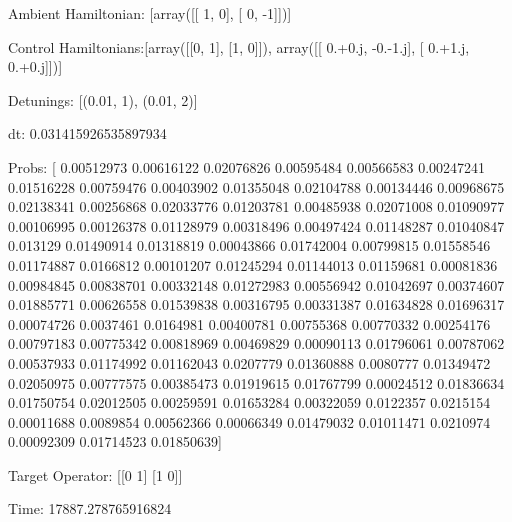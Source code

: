 \documentclass{article}
\begin{document}
    

\newpage

Ambient Hamiltonian: [array([[ 1,  0],
       [ 0, -1]])]

Control Hamiltonians:[array([[0, 1],
       [1, 0]]), array([[ 0.+0.j, -0.-1.j],
       [ 0.+1.j,  0.+0.j]])]

Detunings: [(0.01, 1), (0.01, 2)]

 dt: 0.031415926535897934

Probs: [ 0.00512973  0.00616122  0.02076826  0.00595484  0.00566583  0.00247241
  0.01516228  0.00759476  0.00403902  0.01355048  0.02104788  0.00134446
  0.00968675  0.02138341  0.00256868  0.02033776  0.01203781  0.00485938
  0.02071008  0.01090977  0.00106995  0.00126378  0.01128979  0.00318496
  0.00497424  0.01148287  0.01040847  0.013129    0.01490914  0.01318819
  0.00043866  0.01742004  0.00799815  0.01558546  0.01174887  0.0166812
  0.00101207  0.01245294  0.01144013  0.01159681  0.00081836  0.00984845
  0.00838701  0.00332148  0.01272983  0.00556942  0.01042697  0.00374607
  0.01885771  0.00626558  0.01539838  0.00316795  0.00331387  0.01634828
  0.01696317  0.00074726  0.0037461   0.0164981   0.00400781  0.00755368
  0.00770332  0.00254176  0.00797183  0.00775342  0.00818969  0.00469829
  0.00090113  0.01796061  0.00787062  0.00537933  0.01174992  0.01162043
  0.0207779   0.01360888  0.0080777   0.01349472  0.02050975  0.00777575
  0.00385473  0.01919615  0.01767799  0.00024512  0.01836634  0.01750754
  0.02012505  0.00259591  0.01653284  0.00322059  0.0122357   0.0215154
  0.00011688  0.0089854   0.00562366  0.00066349  0.01479032  0.01011471
  0.0210974   0.00092309  0.01714523  0.01850639]

Target Operator: [[0 1]
 [1 0]]

Time: 17887.278765916824
\end{document}
